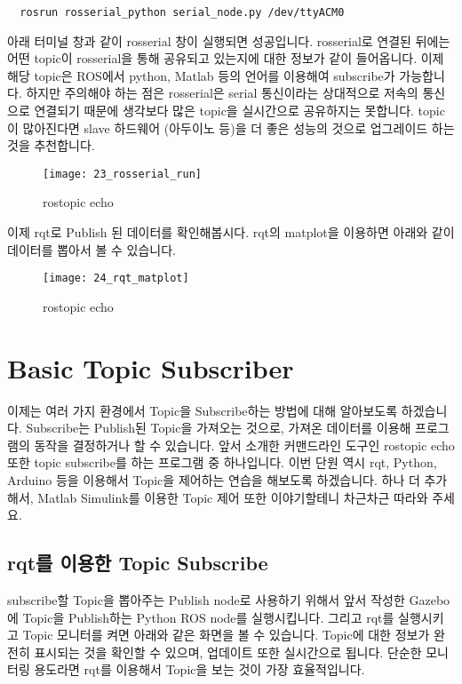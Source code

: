 \documentclass[11pt,fleqn]{book} %
\begin{document}
\begin{verbatim}
  rosrun rosserial_python serial_node.py /dev/ttyACM0
\end{verbatim}

아래 터미널 창과 같이 rosserial 창이 실행되면 성공입니다. rosserial로 연결된 뒤에는 어떤 topic이 rosserial을 통해 공유되고 있는지에 대한 정보가 같이 들어옵니다.
이제 해당 topic은 ROS에서 python, Matlab 등의 언어를 이용해여 subscribe가 가능합니다.
하지만 주의해야 하는 점은 rosserial은 serial 통신이라는 상대적으로 저속의 통신으로 연결되기 때문에 생각보다 많은 topic을 실시간으로 공유하지는 못합니다.
topic이 많아진다면 slave 하드웨어 (아두이노 등)을 더 좋은 성능의 것으로 업그레이드 하는 것을 추천합니다.

\begin{figure}[h]
\centering\texttt{[image: 23\_rosserial\_run]}
\caption{rostopic echo}
\end{figure}

이제 rqt로 Publish 된 데이터를 확인해봅시다. rqt의 matplot을 이용하면 아래와 같이 데이터를 뽑아서 볼 수 있습니다.

\begin{figure}[h]
\centering\texttt{[image: 24\_rqt\_matplot]}
\caption{rostopic echo}
\end{figure}

\section{Basic Topic Subscriber}

이제는 여러 가지 환경에서 Topic을 Subscribe하는 방법에 대해 알아보도록 하겠습니다. Subscribe는 Publish된 Topic을 가져오는 것으로, 가져온 데이터를 이용해 프로그램의 동작을 결정하거나 할 수 있습니다.
앞서 소개한 커맨드라인 도구인 rostopic echo 또한 topic subscribe를 하는 프로그램 중 하나입니다.
이번 단원 역시 rqt, Python, Arduino 등을 이용해서 Topic을 제어하는 연습을 해보도록 하겠습니다.
하나 더 추가해서, Matlab Simulink를 이용한 Topic 제어 또한 이야기할테니 차근차근 따라와 주세요.

\subsection{rqt를 이용한 Topic Subscribe}

subscribe할 Topic을 뽑아주는 Publish node로 사용하기 위해서
앞서 작성한 Gazebo에 Topic을 Publish하는 Python ROS node를 실행시킵니다.
그리고 rqt를 실행시키고 Topic 모니터를 켜면 아래와 같은 화면을 볼 수 있습니다.
Topic에 대한 정보가 완전히 표시되는 것을 확인할 수 있으며, 업데이트 또한 실시간으로 됩니다.
단순한 모니터링 용도라면 rqt를 이용해서 Topic을 보는 것이 가장 효율적입니다.
\end{document}
